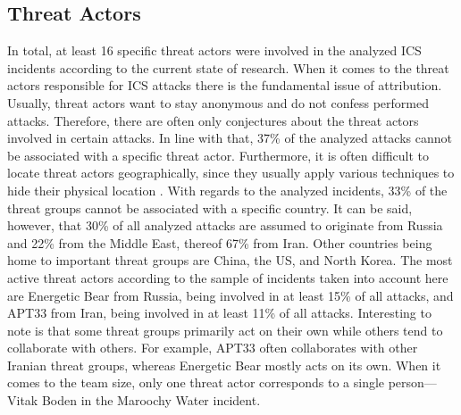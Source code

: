 \documentclass[runningheads]{llncs}
\begin{document}
\subsection{Threat Actors}
\label{subsection:overview-actors}
In total, at least 16 specific threat actors were involved in the analyzed ICS incidents according to the current state of research.
When it comes to the threat actors responsible for ICS attacks there is the fundamental issue of attribution.
Usually, threat actors want to stay anonymous and do not confess performed attacks. %
Therefore, there are often only conjectures about the threat actors involved in certain attacks.
In line with that, 37\% of the analyzed attacks cannot be associated with a specific threat actor.
Furthermore, it is often difficult to locate threat actors geographically, since they usually apply various techniques to hide their physical location \cite{huang.18}.
With regards to the analyzed incidents, 33\% of the threat groups cannot be associated with a specific country.
It can be said, however, that 30\% of all analyzed attacks are assumed to originate from Russia and 22\% from the Middle East, thereof 67\% from Iran.
Other countries being home to important threat groups are China, the US, and North Korea.
The most active threat actors according to the sample of incidents taken into account here are Energetic Bear from Russia, being involved in at least 15\% of all attacks, and APT33 from Iran, being involved in at least 11\% of all attacks.
Interesting to note is that some threat groups primarily act on their own while others tend to collaborate with others.
For example, APT33 often collaborates with other Iranian threat groups, whereas Energetic Bear mostly acts on its own.
When it comes to the team size, only one threat actor corresponds to a single person---Vitak Boden in the Maroochy Water incident.
\end{document}
